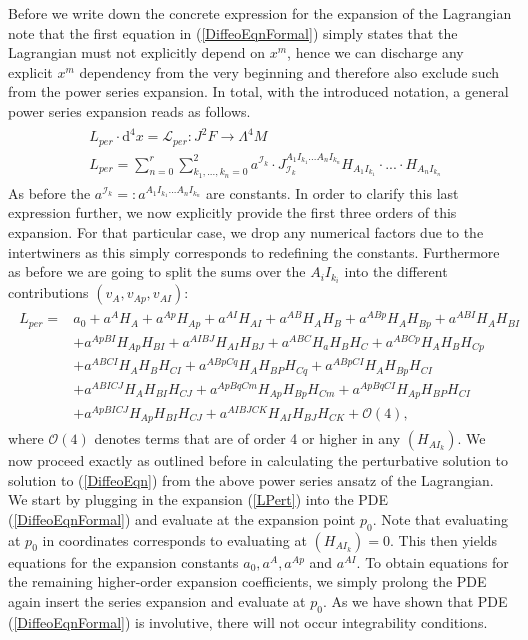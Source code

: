\documentclass[a4paper,12pt, DIV=14, BCOR=5mm, twoside, headsepline, numbers=noenddot]{scrbook}
\begin{document}
Before we write down the concrete expression for the expansion of the Lagrangian note that the first equation in (\ref{DiffeoEqnFormal}) simply states that the Lagrangian must not explicitly depend on $x^m$, hence we can discharge any explicit $x^m$ dependency from the very beginning and therefore also exclude such from the power series expansion. In total, with the introduced notation, a general power series expansion reads as follows. 
\begin{align} \label{generalPowerSL}
    \begin{aligned}
    &L_{per} \cdot  \mathrm{d}^4x = \mathcal{L}_{per} : J^2F \longrightarrow \Lambda^4M \\
    &L_{per} = \sum_{n=0}^r \sum_{k_1,...,k_n = 0}^2 a^{\mathcal{I}_k} \cdot J_{\mathcal{I}_k}^{A_1I_{k_1}...A_nI_{k_n}} H_{A_1I_{k_1}} \cdot ... \cdot H_{A_nI_{k_n}}
    \end{aligned}
\end{align}
%
%
As before the $a^{\mathcal{I}_k} =: a^{A_1I_{k_1}...A_nI_{k_n}}$ are constants. 
In order to clarify this last expression further, we now explicitly provide the first three orders of this expansion. For that particular case, we drop any numerical factors due to the intertwiners as this simply corresponds to redefining the constants. Furthermore as before we are going to split the sums over the ${A_iI_{k_i}}$ into the different contributions $(v_A,v_{Ap},v_{AI})$:
\begin{align}\label{LPert}
\begin{aligned}
    L_{per} = &a_0 + a^A H_A + a^{Ap} H_{Ap} + a^{AI}H_{AI} + a^{AB} H_{A}H_{B} + a^{ABp}H_A H_{Bp} + a^{ABI} H_{A} H_{BI}\\
    &+a^{ApBI}H_{Ap} H_{BI} + a^{AIBJ} H_{AI}H_{BJ} + a^{ABC} H_a H_B H_C 
    + a^{ABCp} H_A H_B H_{Cp} \\
    &+a^{ABCI} H_A H_B H_{CI} + a^{ABpCq} H_{A}H_{BP}H_{Cq} + a^{ABpCI} H_A H_{Bp} H_{CI}\\
    &+ a^{ABICJ} H_A H_{BI}H_{CJ} 
    + a^{ApBqCm} H_{Ap} H_{Bp} H_{Cm}+ a^{ApBq CI} H_{Ap} H_{BP} H_{CI}\\
    &+ a^{Ap BI CJ} H_{Ap} H_{BI} H_{CJ} + a^{AIBJCK} H_{AI} H_{BJ} H_{CK} + \mathcal{O}(4),
\end{aligned}
\end{align}
where $\mathcal{O}(4)$ denotes terms that are of order 4 or higher in any $(H_{AI_k})$. We now proceed exactly as outlined before in calculating the perturbative solution to solution to (\ref{DiffeoEqn}) from the above power series ansatz of the Lagrangian. We start by plugging in the expansion (\ref{LPert}) into the PDE (\ref{DiffeoEqnFormal}) and evaluate at the expansion point $p_0$. Note that evaluating at $p_0$ in coordinates corresponds to evaluating at $(H_{AI_k})=0$. This then yields equations for the expansion constants $a_0, a^A, a^{Ap}$ and $a^{AI}$. To obtain equations for the remaining higher-order expansion coefficients, we simply prolong the PDE again insert the series expansion and evaluate at $p_0$. As we have shown that PDE (\ref{DiffeoEqnFormal}) is involutive, there will not occur integrability conditions.
\end{document}
